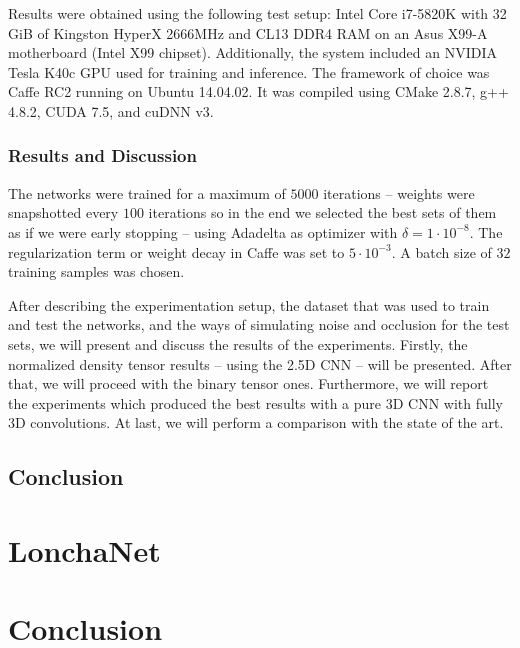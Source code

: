 
Results were obtained using the following test setup: Intel Core i7-5820K with 32 GiB of Kingston HyperX 2666MHz and CL13 DDR4 RAM on an Asus X99-A motherboard (Intel X99 chipset). Additionally, the system included an NVIDIA Tesla K40c GPU used for training and inference. The framework of choice was Caffe RC2 running on Ubuntu 14.04.02. It was compiled using CMake 2.8.7, g++ 4.8.2, CUDA 7.5, and cuDNN v3.

\subsubsection{Results and Discussion}
\label{cha:objrecog:sec:study:subsec:experiments:subsubsec:results}

The networks were trained for a maximum of $5000$ iterations -- weights were snapshotted every $100$ iterations so in the end we selected the best sets of them as if we were early stopping -- using Adadelta as optimizer with $\delta = 1\cdot10^{-8}$. The regularization term or weight decay in Caffe was set to $5\cdot10^{-3}$. A batch size of $32$ training samples was chosen.

After describing the experimentation setup, the dataset that was used to train and test the networks, and the ways of simulating noise and occlusion for the test sets, we will present and discuss the results of the experiments. Firstly, the normalized density tensor results -- using the \acs{2.5D} \acs{CNN} -- will be presented. After that, we will proceed with the binary tensor ones. Furthermore, we will report the experiments which produced the best results with a pure \acs{3D} \acs{CNN} with fully \acs{3D} convolutions. At last, we will perform a comparison with the state of the art.

\subsection{Conclusion}
\label{cha:objrecog:sec:study:subsec:conclusion}

\section{LonchaNet}
\label{cha:objrecog:sec:lonchanet}

\section{Conclusion}
\label{cha:objrecog:sec:conclusion}
